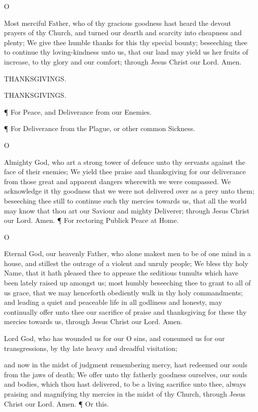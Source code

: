 O

Most merciful Father, who of thy gracious goodness hast heard the devout prayers of thy Church, and turned our dearth and scarcity into cheapness and plenty; We give thee humble thanks for this thy special bounty; beseeching thee to continue thy loving-kindness unto us, that our land may yield us her fruits of increase, to thy glory and our comfort; through Jesus Christ our Lord. Amen.

THANKSGIVINGS.

THANKSGIVINGS.

¶ For Peace, and Deliverance from our Enemies.

¶ For Deliverance from the Plague, or other common Sickness.

O

Almighty God, who art a strong tower of defence unto thy servants against the face of their enemies; We yield thee praise and thanksgiving for our deliverance from those great and apparent dangers wherewith we were compassed. We acknowledge it thy goodness that we were not delivered over as a prey unto them; beseeching thee still to continue such thy mercies towards us, that all the world may know that thou art our Saviour and mighty Deliverer; through Jesus Christ our Lord. Amen. ¶ For rectoring Publick Peace at Home.

O

Eternal God, our heavenly Father, who alone makest men to be of one mind in a house, and stillest the outrage of a violent and unruly people; We bless thy holy Name, that it hath pleased thee to appease the seditious tumults which have been lately raised up amongst us; most humbly beseeching thee to grant to all of us grace, that we may henceforth obediently walk in thy holy commandments; and leading a quiet and peaceable life in all godliness and honesty, may continually offer unto thee our sacrifice of praise and thanksgiving for these thy mercies towards us, through Jesus Christ our Lord. Amen.

Lord God, who has wounded us for our O sins, and consumed us for our transgressions, by thy late heavy and dreadful visitation;

and now in the midst of judgment remembering mercy, hast redeemed our souls from the jaws of death; We offer unto thy fatherly goodness ourselves, our souls and bodies, which thou hast delivered, to be a living sacrifice unto thee, always praising and magnifying thy mercies in the midst of thy Church, through Jesus Christ our Lord. Amen. ¶ Or this.

